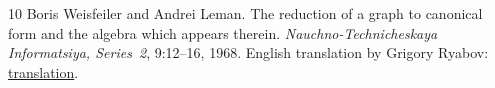\begin{thebibliography}{10}
Boris Weisfeiler and Andrei Leman.
\newblock The reduction of a graph to canonical form and the algebra which
appears therein.
\newblock \emph{Nauchno-Technicheskaya Informatsiya, Series~2},
9:12--16, 1968.
\newblock English translation by Grigory Ryabov:
\href{https://www.iti.zcu.cz/wl2018/pdf/wl_paper_translation.pdf}{translation}.

\end{thebibliography}
